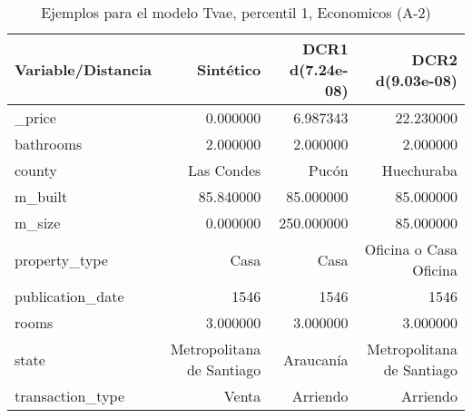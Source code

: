 \begin{table}[H]
\centering
\fontsize{10}{14}\selectfont
\caption{Ejemplos para el modelo Tvae, percentil 1, Economicos (A-2)}
\label{table-example-economicos-a-2-tvae-1p}
\begin{tabular}{|l|r|r|r|}
\hline
\rowcolor[gray]{0.8}
Variable/Distancia & Sintético & DCR1 d(7.24e-08) & DCR2 d(9.03e-08) \\
\hline \_price & \cellcolor[rgb]{0.9, 0.54, 0.52} 0.000000 & 6.987343 & 22.230000 \\
\hline bathrooms & \cellcolor[rgb]{0.9, 0.54, 0.52} 2.000000 & \cellcolor[rgb]{0.9, 0.54, 0.52} 2.000000 & \cellcolor[rgb]{0.9, 0.54, 0.52} 2.000000 \\
\hline county & \cellcolor[rgb]{0.9, 0.54, 0.52} Las Condes & Pucón & Huechuraba \\
\hline m\_built & \cellcolor[rgb]{0.9, 0.54, 0.52} 85.840000 & 85.000000 & 85.000000 \\
\hline m\_size & \cellcolor[rgb]{0.9, 0.54, 0.52} 0.000000 & 250.000000 & 85.000000 \\
\hline property\_type & \cellcolor[rgb]{0.9, 0.54, 0.52} Casa & \cellcolor[rgb]{0.9, 0.54, 0.52} Casa & Oficina o Casa Oficina \\
\hline publication\_date & \cellcolor[rgb]{0.9, 0.54, 0.52} 1546 & \cellcolor[rgb]{0.9, 0.54, 0.52} 1546 & \cellcolor[rgb]{0.9, 0.54, 0.52} 1546 \\
\hline rooms & \cellcolor[rgb]{0.9, 0.54, 0.52} 3.000000 & \cellcolor[rgb]{0.9, 0.54, 0.52} 3.000000 & \cellcolor[rgb]{0.9, 0.54, 0.52} 3.000000 \\
\hline state & \cellcolor[rgb]{0.9, 0.54, 0.52} Metropolitana de Santiago & Araucanía & \cellcolor[rgb]{0.9, 0.54, 0.52} Metropolitana de Santiago \\
\hline transaction\_type & \cellcolor[rgb]{0.9, 0.54, 0.52} Venta & Arriendo & Arriendo \\
\hline
\end{tabular}
\end{table}
